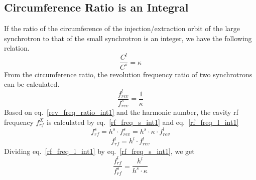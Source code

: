%
 


\subsection{Circumference Ratio is an Integral}
\label{sec:cir_integer}
If the ratio of the circumference of the injection/extraction orbit of the large synchrotron to that of the small synchrotron is an integer, we have the following relation. 
\begin{equation}
\frac{C^l}{C^s}=\kappa \label{circumference_ratio_int1}
\end{equation}
From the circumference ratio, the revolution frequency ratio of two synchrotrons can be calculated.
\begin{equation}
\frac{f_{\mathit{rev}}^{l}}{f_{\mathit{rev}}^{s}}=\frac{1}{\kappa} \label{rev_freq_ratio_int1}
\end{equation}
Based on eq.~\ref{rev_freq_ratio_int1} and the harmonic number, the cavity rf frequency $f_{rf}^{X}$ is calculated by eq.~\ref{rf_freq_s_int1} and eq.~\ref{rf_freq_l_int1}
\begin{equation} 
f_{\mathit{rf}}^{s}= h^s \cdot f_{\mathit{rev}}^{s}=h^s \cdot \kappa \cdot f_{rev}^{l} \label{rf_freq_s_int1}
\end{equation}
\begin{equation} 
f_{\mathit{rf}}^{l}= h^l \cdot f_{\mathit{rev}}^{l} \label{rf_freq_l_int1}
\end{equation}
Dividing eq.~\ref{rf_freq_l_int1} by eq.~\ref{rf_freq_s_int1}, we get
\begin{equation} 
\frac{f_{\mathit{rf}}^{l}}{f_{\mathit{rf}}^{s}}= \frac{h^l}{h^s \cdot \kappa} \label{rf_freq_ratio1}
\end{equation}

